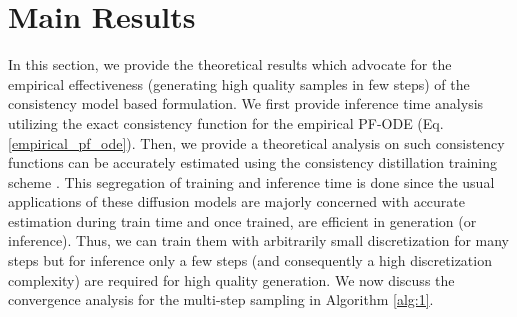 \documentclass[11pt]{article}
\newcommand{\xh}[1]{\textcolor[HTML]{66CCFF}{#1}}
\begin{document}
\section{Main Results}
\label{sec_3_results}
\noindent
In this section, we provide the theoretical results which advocate for the empirical effectiveness \cite{heek2024multistep} (generating high quality samples in few steps) of the consistency model based formulation. We first provide inference time analysis utilizing the exact consistency function for the empirical PF-ODE (Eq.\ref{empirical_pf_ode}). Then, we provide a theoretical analysis on such consistency functions can be accurately estimated using the consistency distillation training scheme \cite{kim2023consistency}. 
This segregation of training and inference time is done since the usual applications of these diffusion models are majorly concerned with accurate estimation during train time and once trained, are efficient in generation (or inference). Thus, we can train them with arbitrarily small discretization for many steps but for inference only a few steps (and consequently a high discretization complexity) are required for high quality generation.
We now discuss the convergence analysis for the multi-step sampling in Algorithm \ref{alg:1}.






\end{document}
